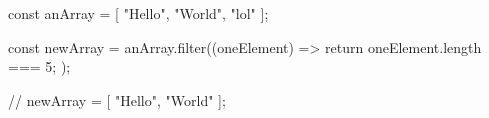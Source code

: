 const anArray = [ "Hello", "World", "lol" ];

const newArray = anArray.filter((oneElement) => {
    return oneElement.length === 5;
});

// newArray = [ "Hello", "World" ];
